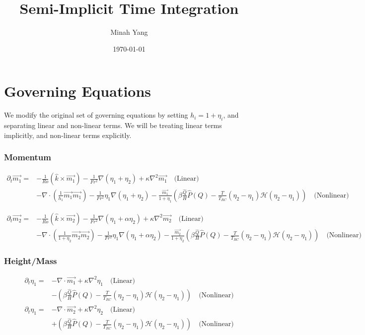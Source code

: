 \documentclass[10pt]{article}
\title{Semi-Implicit Time Integration}
\author{Minah Yang}
\date{\today}
\newcommand{\pd}[1]{\partial_{#1}}
\newcommand{\HH}{\mathcal{H}}
\begin{document}
\maketitle
\section{Governing Equations}
We modify the original set of governing equations by setting $h_i=1+\eta_i$, and separating linear and non-linear terms. We will be treating linear terms implicitly, and non-linear terms explicitly. 
\subsubsection*{Momentum}
\begin{align*}
\pd{t}\vec{m_1} =& - \frac{1}{Ro}\left(\hat{k}\times \vec{m_1}\right)
-\frac{1}{Fr^2}\nabla\left(\eta_1+\eta_2\right)+ \kappa \nabla ^2 \vec{m_1}\quad\text{(Linear)}\\
&- \nabla \cdot \left(\frac{1}{h_1}\vec{m_1}\vec{m_1}\right) -\frac{1}{Fr^2} \eta_1\nabla\left(\eta_1 + \eta_2\right) -\frac{\vec{m_1}}{1+\eta_1} \left( \beta \frac{\hat{Q}}{H}\hat{P}(Q) - \frac{T}{T_{RC}}(\eta_2-\eta_1)\HH{(\eta_2-\eta_1)}\right) \quad\text{(Nonlinear)}
\end{align*}

\begin{align*}
\pd{t}\vec{m_2} =& - \frac{1}{Ro}\left(\hat{k}\times \vec{m_2}\right)
-\frac{1}{Fr^2}\nabla\left(\eta_1+\alpha \eta_2\right)+ \kappa \nabla ^2 \vec{m_2}\quad\text{(Linear)}\\
&- \nabla \cdot \left(\frac{1}{1+\eta_2}\vec{m_2}\vec{m_2}\right) -\frac{1}{Fr^2} \eta_1\nabla\left(\eta_1 + \alpha\eta_2\right) -\frac{\vec{m_2}}{1+\eta_2} \left( \beta \frac{\hat{Q}}{H}\hat{P}(Q) - \frac{T}{T_{RC}}(\eta_2-\eta_1)\HH{(\eta_2-\eta_1)}\right) \quad\text{(Nonlinear)}
\end{align*}


\subsubsection*{Height/Mass}

\begin{align*}
\pd{t}\eta_1 =& -\nabla \cdot\vec{m_1} + \kappa \nabla ^2 \eta_1  \quad\text{(Linear)} \\ &-\left(\beta\frac{\hat{Q}}{H}\hat{P}(Q)-\frac{T}{T_{RC}}(\eta_2-\eta_1)\HH(\eta_2-\eta_1)\right)\quad\text{(Nonlinear)}
\end{align*}
\begin{align*}
\pd{t}\eta_1 =& -\nabla \cdot\vec{m_2} + \kappa \nabla ^2 \eta_2  \quad\text{(Linear)} \\ &+\left(\beta\frac{\hat{Q}}{H}\hat{P}(Q)-\frac{T}{T_{RC}}(\eta_2-\eta_1)\HH(\eta_2-\eta_1)\right)\quad\text{(Nonlinear)}
\end{align*}
\end{document}
